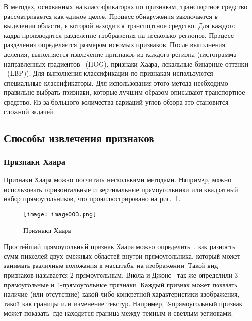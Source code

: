 В методах, основанных на классификаторах по признакам, транспортное средство рассматривается как единое целое. Процесс обнаружения заключается в выделении области, в которой находится транспортное средство. Для каждого кадра производится разделение изображения на несколько регионов. Процесс разделения определяется размером искомых признаков. После выполнения деления, выполняется извлечение признаков из каждого региона (гистограмма направленных градиентов ~(HOG), признаки Хаара, локальные бинарные оттенки ~(LBP)). Для выполнения классификации по признакам используются специальные классификаторы. Для использования этого метода необходимо правильно выбрать признаки, которые лучшим образом описывают транспортное средство. Из-за большого количества вариаций углов обзора это становится сложной задачей.

\subsection{Способы извлечения признаков}

\subsubsection{Признаки Хаара}

Признаки Хаара можно посчитать несколькими методами. Например, можно использовать горизонтальные и вертикальные прямоугольники или квадратный набор прямоугольников, что проиллюстрировано на рис.~\ref{fig:image003}.

\begin{figure}[htbp]
\centering
\texttt{[image: image003.png]}
\caption{Признаки Хаара~\cite{two}}%
\label{fig:image003}
\end{figure}

Простейший прямоугольный признак Хаара можно определить~\cite{two}, как разность сумм пикселей двух смежных областей внутри прямоугольника, который может занимать различные положения и масштабы на изображении. Такой вид признаков называется 2-прямоугольным. Виола и Джонс~\cite{three} так же определили 3-прямоугольные и 4-прямоугольные признаки. Каждый признак может показать наличие (или отсутствие) какой-либо конкретной характеристики изображения, такой как границы или изменение текстур. Например, 2-прямоугольный признак может показать, где находится граница между темным и светлым регионами.

